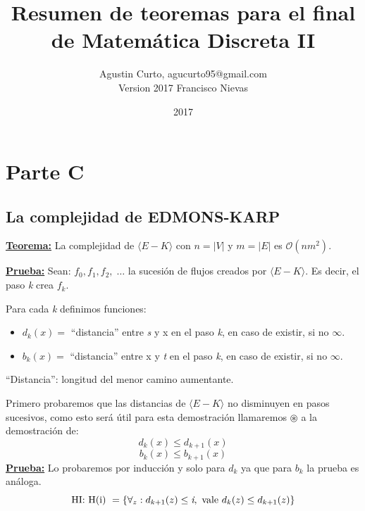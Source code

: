 \documentclass[12pt,a4paper]{report}
\author{Agustin Curto, agucurto95@gmail.com\\
        Version 2017 Francisco Nievas}
\title{Resumen de teoremas para el final \\ de Matemática Discreta  II}
\date{2017}
\providecommand{\abs}[1]{\lvert#1\rvert}
\begin{document}
  \maketitle
  \tableofcontents


  \chapter{Parte C}

  	\section{La complejidad de EDMONS-KARP}
  		\textbf{\underline{Teorema:}} La complejidad de $\langle E-K \rangle$ con $n = \abs{V}$ y $m = \abs{E}$ es $\mathcal{O}(nm^{2})$.

  		\textbf{\underline{Prueba:}} Sean: $f_{0}, f_{1}, f_{2}, \; \dotsc$ \; la sucesión de flujos creados por $\langle E-K \rangle$. Es decir, el paso \textit{k} crea $f_{k}$.
  			\vspace{5mm}
  			\par Para cada \textit{k} definimos funciones:
  			\begin{itemize}
  				\item $d_{k}(x) =$ \textquotedblleft distancia\textquotedblright \; entre \textit{s} y x en el paso \textit{k}, en caso de existir, si no $\infty$.
  				\item $b_{k}(x) =$ \textquotedblleft distancia\textquotedblright \; entre x y \textit{t} en el paso \textit{k}, en caso de existir, si no $\infty$.
  			\end{itemize}

  			\textquotedblleft Distancia\textquotedblright: longitud del menor camino aumentante.

    			\vspace{5mm}
    			\par Primero probaremos que las distancias de $\langle E-K \rangle$ no disminuyen en pasos sucesivos,
           como esto será útil para esta demostración llamaremos $\circledast$ a la demostración de:
    				\[ d_{k}(x) \leq d_{k+1}(x) \]
    				\[ b_{k}(x) \leq b_{k+1}(x) \]
            \textbf{\underline{Prueba:}} Lo probaremos por inducción y solo para $d_{k}$ ya que para $b_{k}$ la prueba es análoga.
        			\[ \textup{HI: H(i) } = \lbrace\forall_{z}: d_{k + 1}(z) \leq \textit{i}, \textup{ vale } d_{k}(z) \leq d_{k + 1}(z)\rbrace \]
\end{document}
